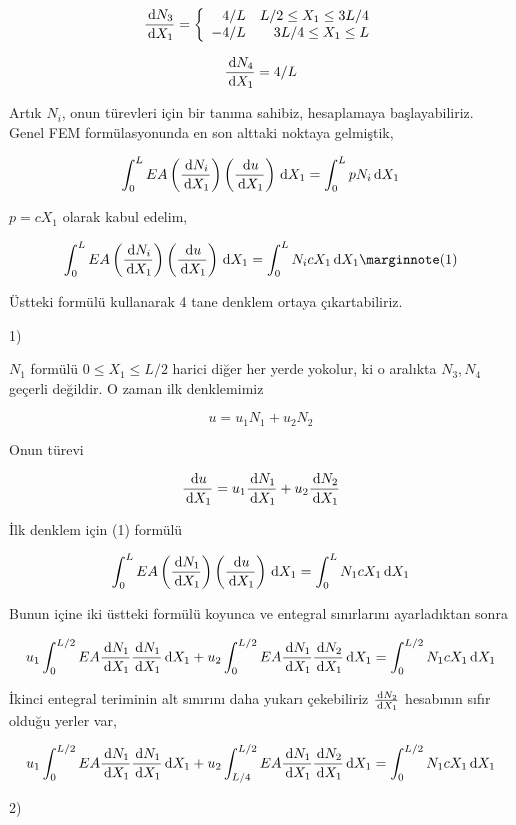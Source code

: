 \documentclass[12pt,fleqn]{article}\usepackage{../../common}
\begin{document}
$$
\frac{\,\mathrm{d} N_3}{\,\mathrm{d} X_1} = \left\{ \begin{array}{rr}
4/L  & L/2 \le X_1 \le 3L/4 \\
-4/L & 3L/4 \le X_1 \le L
\end{array} \right.
$$

$$
\frac{\,\mathrm{d} N_4}{\,\mathrm{d} X_1} = 4/L
$$

Artık $N_i$, onun türevleri için bir tanıma sahibiz, hesaplamaya
başlayabiliriz. Genel FEM formülasyonunda en son alttaki noktaya gelmiştik,

$$
\int_{0}^{L} EA
\left( \frac{\,\mathrm{d} N_i}{\,\mathrm{d} X_1} \right)
\left( \frac{\,\mathrm{d} u}{\,\mathrm{d} X_1} \right)  \,\mathrm{d} X_1
= \int_{0}^{L} p N_i \,\mathrm{d} X_1
$$

$p = cX_1$ olarak kabul edelim, 

$$
\int_{0}^{L} EA
\left( \frac{\ud N_i}{\ud X_1} \right) 
\left( \frac{\ud u}{\ud X_1} \right) \ud X_1
= \int_{0}^{L} N_i c X_1 \ud X_1
\mlabel{1}
$$

Üstteki formülü kullanarak 4 tane denklem ortaya çıkartabiliriz.

1)

$N_1$ formülü $0 \le X_1 \le L/2$ harici diğer her yerde yokolur, ki o
aralıkta $N_3,N_4$ geçerli değildir. O zaman ilk denklemimiz

$$
u = u_1 N_1 + u_2 N_2 
$$

Onun türevi 

$$
\frac{\,\mathrm{d} u}{\,\mathrm{d} X_1} = u_1 \frac{\,\mathrm{d} N_1}{\,\mathrm{d} X_1} + u_2 \frac{\,\mathrm{d} N_2}{\,\mathrm{d} X_1} 
$$

İlk denklem için (1) formülü

$$
\int_{0}^{L} EA
\left( \frac{\,\mathrm{d} N_1}{\,\mathrm{d} X_1} \right) 
\left( \frac{\,\mathrm{d} u}{\,\mathrm{d} X_1} \right) \,\mathrm{d} X_1
= \int_{0}^{L} N_1 c X_1 \,\mathrm{d} X_1
$$

Bunun içine iki üstteki formülü koyunca ve entegral sınırlarını ayarladıktan
sonra

$$
u_1 \int_{0}^{L/2} EA \frac{\,\mathrm{d} N_1}{\,\mathrm{d} X_1} \frac{\,\mathrm{d} N_1}{\,\mathrm{d} X_1} \,\mathrm{d} X_1 +
u_2 \int_{0}^{L/2} EA \frac{\,\mathrm{d} N_1}{\,\mathrm{d} X_1} \frac{\,\mathrm{d} N_2}{\,\mathrm{d} X_1} \,\mathrm{d} X_1 =
\int_{0}^{L/2} N_1 c X_1 \,\mathrm{d} X_1
$$

İkinci entegral teriminin alt sınırını daha yukarı çekebiliriz $\frac{\,\mathrm{d} N_2}{\,\mathrm{d} X_1}$
hesabının sıfır olduğu yerler var, 

$$
u_1 \int_{0}^{L/2} EA \frac{\,\mathrm{d} N_1}{\,\mathrm{d} X_1} \frac{\,\mathrm{d} N_1}{\,\mathrm{d} X_1} \,\mathrm{d} X_1 +
u_2 \int_{L/4}^{L/2} EA \frac{\,\mathrm{d} N_1}{\,\mathrm{d} X_1} \frac{\,\mathrm{d} N_2}{\,\mathrm{d} X_1} \,\mathrm{d} X_1 =
\int_{0}^{L/2} N_1 c X_1 \,\mathrm{d} X_1
$$

2)
\end{document}
